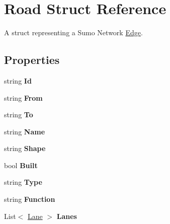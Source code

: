 \hypertarget{struct_road}{}\section{Road Struct Reference}
\label{struct_road}


A struct representing a Sumo Network \mbox{\hyperlink{class_edge}{Edge}}.  


\subsection*{Properties}
\begin{DoxyCompactItemize}
\item 
\mbox{\label{struct_road_a6678afc1976c8a4f31df86f477405d88}} 
string {\bfseries Id}
\item 
\mbox{\label{struct_road_a49e37b6d3aa49a7dd10d2a44c7499902}} 
string {\bfseries From}
\item 
\mbox{\label{struct_road_a12c9445b64ab9ad9b8474f869105410e}} 
string {\bfseries To}
\item 
\mbox{\label{struct_road_aefebfb290f424176b269f6a3cf7e9dd5}} 
string {\bfseries Name}
\item 
\mbox{\label{struct_road_a1a9a5739d0ce86eb2c72c346a0f7ad1f}} 
string {\bfseries Shape}
\item 
\mbox{\label{struct_road_a0b29109e7a699c4e3211d6b21130b45a}} 
bool {\bfseries Built}
\item 
\mbox{\label{struct_road_a29142c7b40b1588fdf2c65edc622882e}} 
string {\bfseries Type}
\item 
\mbox{\label{struct_road_a38db85409b5fc7c8a5623ef6a6f9ba37}} 
string {\bfseries Function}
\item 
\mbox{\label{struct_road_a459591805ac1a1bb0b94930ffb3ba95e}} 
List$<$ \mbox{\hyperlink{struct_lane}{Lane}} $>$ {\bfseries Lanes}
\end{DoxyCompactItemize}


